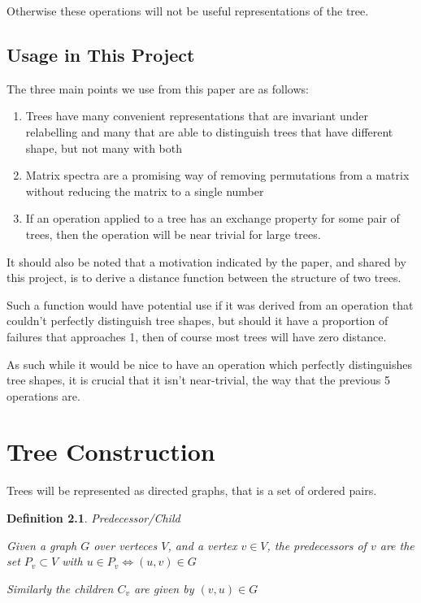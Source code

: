 \documentclass[10pt,a4paper]{report}
\newtheorem{definition}{Definition}
\begin{document}
Otherwise these operations will not be useful representations of the tree.

\section{Usage in This Project}

The three main points we use from this paper are as follows:
\begin{enumerate}
	\item Trees have many convenient representations that are invariant under
		relabelling and many that are able to distinguish trees that have
		different shape, but not many with both
	\item Matrix spectra are a promising way of removing permutations from a
		matrix without reducing the matrix to a single number
	\item If an operation applied to a tree has an exchange property for some
		pair of trees, then the operation will be near trivial for large trees.
\end{enumerate}

It should also be noted that a motivation indicated by the paper, and shared by this project, is to derive a distance function between the structure of two trees.

Such a function would have potential use if it was derived from an operation that couldn't perfectly distinguish tree shapes, but should it have a proportion of failures that approaches 1, then of course most trees will have zero distance.

As such while it would be nice to have an operation which perfectly distinguishes tree shapes, it is crucial that it isn't near-trivial, the way that the previous 5 operations are.

\chapter{Tree Construction}

Trees will be represented as directed graphs, that is a set of ordered pairs.

\begin{definition} Predecessor/Child

	Given a graph $G$ over verteces $V$, and a vertex $v \in V$, the
	predecessors of $v$ are the set $P_v \subset V$ with $u \in P_v
	\Leftrightarrow (u, v) \in G$

	Similarly the children $C_v$ are given by $(v, u) \in G$
\end{definition}
\end{document}
